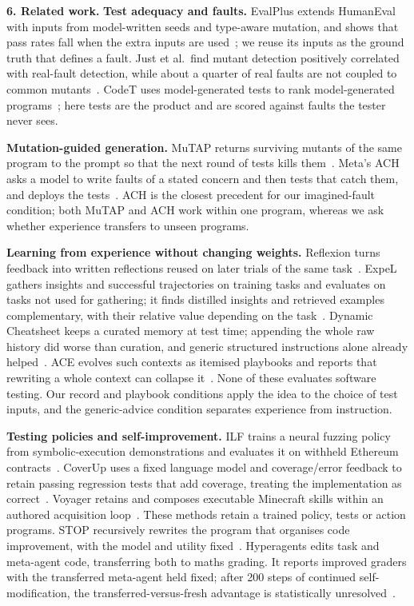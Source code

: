 \documentclass[11pt]{article}
\begin{document}
\hypertarget{related}{}
\textbf{6. Related work.}
\textbf{Test adequacy and faults.} EvalPlus extends HumanEval with inputs from
model-written seeds and type-aware mutation, and shows that pass rates fall when
the extra inputs are used~\cite[\S2.1; \S3]{evalplus}; we reuse its inputs as the
ground truth that defines a fault. Just et al.\ find mutant detection positively
correlated with real-fault detection, while about a quarter of real faults are not
coupled to common mutants~\cite[\S3.1--3.3]{mutants}. CodeT uses model-generated
tests to rank model-generated programs~\cite[\S2.1--2.2]{codet}; here tests are the
product and are scored against faults the tester never sees.

\textbf{Mutation-guided generation.} MuTAP returns surviving mutants of the same
program to the prompt so that the next round of tests kills them~\cite[\S3.4]{mutap}.
Meta's ACH asks a model to write faults of a stated concern and then tests that
catch them, and deploys the tests~\cite[\S1; \S2]{ach}. ACH is the closest precedent
for our imagined-fault condition; both MuTAP and ACH work within one program,
whereas we ask whether experience transfers to unseen programs.

\textbf{Learning from experience without changing weights.} Reflexion turns
feedback into written reflections reused on later trials of the same
task~\cite[\S1; \S4.3]{reflexion}. ExpeL gathers insights and successful
trajectories on training tasks and evaluates on tasks not used for gathering; it
finds distilled insights and retrieved examples complementary, with their
relative value depending on the task~\cite[\S5.1--5.2]{expel}. Dynamic Cheatsheet
keeps a curated memory at test time; appending the whole raw history did worse
than curation, and generic structured instructions alone already helped~\cite[\S2.3; \S4.3]{cheatsheet}.
ACE evolves such contexts as itemised playbooks and reports that rewriting a
whole context can collapse it~\cite[\S2.2; \S4.3]{ace}. None of these evaluates
software testing. Our record and playbook conditions apply the idea to the choice
of test inputs, and the generic-advice condition separates experience from
instruction.

\textbf{Testing policies and self-improvement.}
ILF trains a neural fuzzing policy from symbolic-execution demonstrations and
evaluates it on withheld Ethereum contracts~\cite[\S\S4--6]{ilf}.
CoverUp uses a fixed language model and coverage/error feedback to retain
passing regression tests that add coverage, treating the implementation as
correct~\cite[\S\S1,3--4]{coverup}.
Voyager retains and composes executable Minecraft skills within an authored
acquisition loop~\cite[\S\S2.2--2.3]{voyager}.
These methods retain a trained policy, tests or action programs.
STOP recursively rewrites the program that organises code improvement,
with the model and utility fixed~\cite[\S\S3--5]{stop}.
Hyperagents edits task and meta-agent code, transferring both to maths grading.
It reports improved graders with the transferred meta-agent held fixed;
after 200 steps of continued self-modification, the transferred-versus-fresh
advantage is statistically unresolved~\cite[\S\S5.2--5.3]{hyperagents}.
\end{document}
